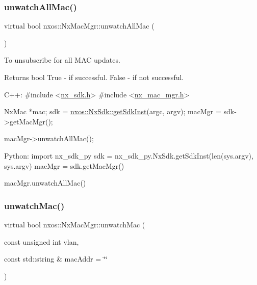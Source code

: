 \subsubsection{\texorpdfstring{unwatch\+All\+Mac()}{unwatchAllMac()}}
{\footnotesize\ttfamily virtual bool nxos\+::\+Nx\+Mac\+Mgr\+::unwatch\+All\+Mac (\begin{DoxyParamCaption}{ }\end{DoxyParamCaption})\hspace{0.3cm}{\ttfamily [pure virtual]}}

To unsubscribe for all M\+AC updates.

\begin{DoxyReturn}{Returns}
bool True -\/ if successful. False -\/ if not successful.
\end{DoxyReturn}

\begin{DoxyCode}
C++:
\textcolor{preprocessor}{     #include <\mbox{\hyperlink{nx__sdk_8h}{nx\_sdk.h}}>}
\textcolor{preprocessor}{     #include <\mbox{\hyperlink{nx__mac__mgr_8h}{nx\_mac\_mgr.h}}>}

     NxMac *mac;
     sdk = \mbox{\hyperlink{classnxos_1_1_nx_sdk_a5050e2d26c40744b4fc7862068a83f39}{nxos::NxSdk::getSdkInst}}(argc, argv);
     macMgr = sdk->getMacMgr();

     macMgr->unwatchAllMac();

Python:
     \textcolor{keyword}{import} nx\_sdk\_py
     sdk = nx\_sdk\_py.NxSdk.getSdkInst(len(sys.argv), sys.argv)
     macMgr = sdk.getMacMgr()

     macMgr.unwatchAllMac()
\end{DoxyCode}
 \mbox{\label{classnxos_1_1_nx_mac_mgr_af3a7878b8b604baa1e388c9b9ea9c952}} 
\subsubsection{\texorpdfstring{unwatch\+Mac()}{unwatchMac()}}
{\footnotesize\ttfamily virtual bool nxos\+::\+Nx\+Mac\+Mgr\+::unwatch\+Mac (\begin{DoxyParamCaption}\item[{const unsigned int}]{vlan,  }\item[{const std\+::string \&}]{mac\+Addr = {\ttfamily \char`\"{}\char`\"{}} }\end{DoxyParamCaption})\hspace{0.3cm}{\ttfamily [pure virtual]}}

